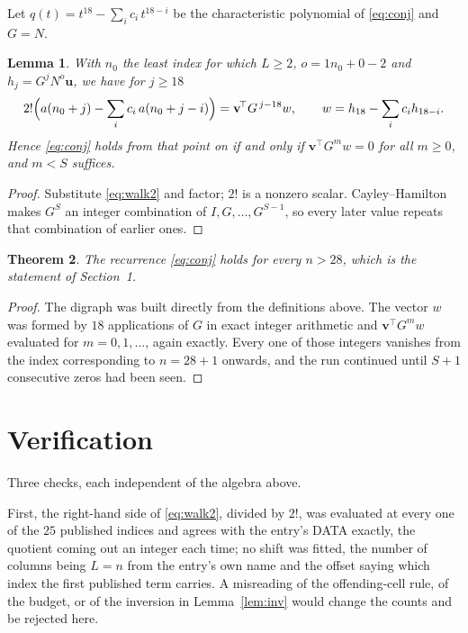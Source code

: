 \documentclass[11pt,a4paper]{article}
\theoremstyle{plain}
\newtheorem{theorem}{Theorem}
\newtheorem{lemma}[theorem]{Lemma}
\theoremstyle{definition}
\begin{document}
Let $q(t)=t^{18}-\sum_i c_i\,t^{18-i}$ be the characteristic polynomial of
\eqref{eq:conj} and $G=N$.

\begin{lemma}\label{lem:crit}
With $n_0$ the least index for which $L\ge2$, $o=1n_0+0-2$ and
$h_j=G^{j}N^{o}\mathbf{u}$, we have for $j\ge18$
\[
2!\Bigl(a(n_0+j)-\sum_i c_i\,a(n_0+j-i)\Bigr)=\mathbf{v}^{\!\top}G^{\,j-18}w,
\qquad w=h_{18}-\sum_i c_i h_{18-i} .
\]
Hence \eqref{eq:conj} holds from that point on if and only if
$\mathbf{v}^{\!\top}G^{m}w=0$ for all $m\ge0$, and $m<S$ suffices.
\end{lemma}

\begin{proof}
Substitute \eqref{eq:walk2} and factor; $2!$ is a nonzero scalar. Cayley--Hamilton
makes $G^{S}$ an integer combination of $I,G,\dots,G^{S-1}$, so every later value repeats
that combination of earlier ones.
\end{proof}

\begin{theorem}
The recurrence \eqref{eq:conj} holds for every $n>28$, which is the statement of
Section~1.
\end{theorem}

\begin{proof}
The digraph was built directly from the definitions above. The vector $w$ was formed by
$18$ applications of $G$ in exact integer arithmetic and $\mathbf{v}^{\!\top}G^{m}w$
evaluated for $m=0,1,\dots$, again exactly. Every one of those integers vanishes from the
index corresponding to $n=28+1$ onwards, and the run continued until $S+1$ consecutive
zeros had been seen.
\end{proof}

\section{Verification}

Three checks, each independent of the algebra above.

First, the right-hand side of \eqref{eq:walk2}, divided by $2!$, was evaluated at every
one of the $25$ published indices and agrees with the entry's DATA exactly, the quotient
coming out an integer each time; no shift was fitted, the number of columns being
$L=n$ from the entry's own name and the offset saying which index the first published
term carries. A misreading of the offending-cell rule, of the budget, or of the inversion in
Lemma~\ref{lem:inv} would change the counts and be rejected here.
\end{document}

